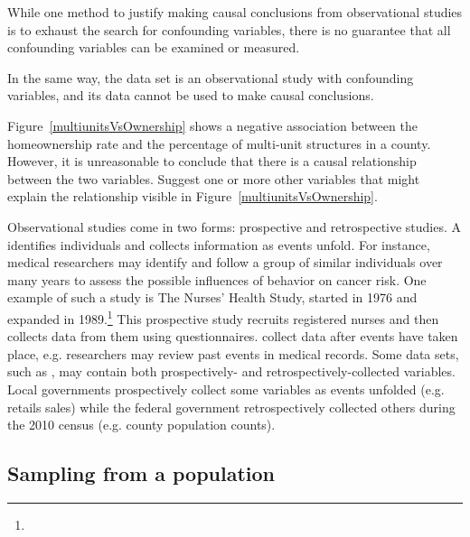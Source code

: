 While one method to justify making causal conclusions from observational studies is to exhaust the search for confounding variables, there is no guarantee that all confounding variables can be examined or measured.

In the same way, the  data set is an observational study with confounding variables, and its data cannot be used to make causal conclusions.

\begin{exercisewrap}
\begin{nexercise}
Figure~\ref{multiunitsVsOwnership} shows a negative association between the homeownership rate and the percentage of multi-unit structures in a county. However, it is unreasonable to conclude that there is a causal relationship between the two variables. Suggest one or more other variables that might explain the relationship visible in Figure~\ref{multiunitsVsOwnership}.\footnotemark
\end{nexercise}
\end{exercisewrap}

Observational studies come in two forms: prospective and retrospective studies. A  identifies individuals and collects information as events unfold. For instance, medical researchers may identify and follow a group of similar individuals over many years to assess the possible influences of behavior on cancer risk. One example of such a study is The Nurses' Health Study, started in 1976 and expanded in 1989.\footnote{} This prospective study recruits registered nurses and then collects data from them using questionnaires.  collect data after events have taken place, e.g. researchers may review past events in medical records. Some data sets, such as , may contain both prospectively- and retrospectively-collected variables. Local governments prospectively collect some variables as events unfolded (e.g. retails sales) while the federal government retrospectively collected others during the 2010 census (e.g. county population counts).


\subsection{Sampling from a population}

